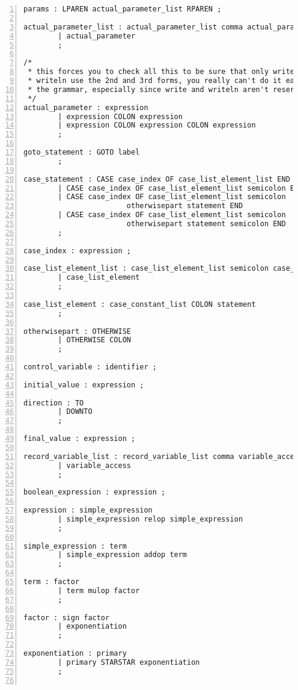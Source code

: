 \begin{Verbatim}[numbers=left]
params : LPAREN actual_parameter_list RPAREN ;

actual_parameter_list : actual_parameter_list comma actual_parameter
        | actual_parameter
        ;

/*
 * this forces you to check all this to be sure that only write and
 * writeln use the 2nd and 3rd forms, you really can't do it easily in
 * the grammar, especially since write and writeln aren't reserved
 */
actual_parameter : expression
        | expression COLON expression
        | expression COLON expression COLON expression
        ;

goto_statement : GOTO label
        ;

case_statement : CASE case_index OF case_list_element_list END
        | CASE case_index OF case_list_element_list semicolon END
        | CASE case_index OF case_list_element_list semicolon
                        otherwisepart statement END
        | CASE case_index OF case_list_element_list semicolon
                        otherwisepart statement semicolon END
        ;

case_index : expression ;

case_list_element_list : case_list_element_list semicolon case_list_element
        | case_list_element
        ;

case_list_element : case_constant_list COLON statement
        ;

otherwisepart : OTHERWISE
        | OTHERWISE COLON
        ;

control_variable : identifier ;

initial_value : expression ;

direction : TO
        | DOWNTO
        ;

final_value : expression ;

record_variable_list : record_variable_list comma variable_access
        | variable_access
        ;

boolean_expression : expression ;

expression : simple_expression
        | simple_expression relop simple_expression
        ;

simple_expression : term
        | simple_expression addop term
        ;

term : factor
        | term mulop factor
        ;

factor : sign factor
        | exponentiation
        ;
        
exponentiation : primary
        | primary STARSTAR exponentiation
        ;


\end{Verbatim}

